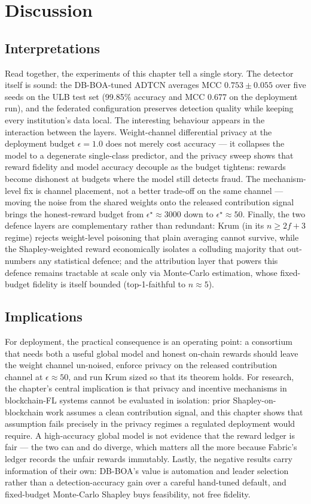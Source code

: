\FloatBarrier

\section{Discussion}
\label{sec:discussion}

\subsection{Interpretations}
Read together, the experiments of this chapter tell a single story. The detector itself is sound: the DB-BOA-tuned ADTCN averages MCC $0.753 \pm 0.055$ over five seeds on the ULB test set (99.85\% accuracy and MCC 0.677 on the deployment run), and the federated configuration preserves detection quality while keeping every institution's data local. The interesting behaviour appears in the interaction between the layers. Weight-channel differential privacy at the deployment budget $\epsilon=1.0$ does not merely cost accuracy --- it collapses the model to a degenerate single-class predictor, and the privacy sweep shows that reward fidelity and model accuracy decouple as the budget tightens: rewards become dishonest at budgets where the model still detects fraud. The mechanism-level fix is channel placement, not a better trade-off on the same channel --- moving the noise from the shared weights onto the released contribution signal brings the honest-reward budget from $\epsilon^{\star}\approx 3000$ down to $\epsilon^{\star}\approx 50$. Finally, the two defence layers are complementary rather than redundant: Krum (in its $n\ge 2f+3$ regime) rejects weight-level poisoning that plain averaging cannot survive, while the Shapley-weighted reward economically isolates a colluding majority that out-numbers any statistical defence; and the attribution layer that powers this defence remains tractable at scale only via Monte-Carlo estimation, whose fixed-budget fidelity is itself bounded (top-1-faithful to $n\approx 5$).

\subsection{Implications}
For deployment, the practical consequence is an operating point: a consortium that needs both a useful global model and honest on-chain rewards should leave the weight channel un-noised, enforce privacy on the released contribution channel at $\epsilon\approx 50$, and run Krum sized so that its theorem holds. For research, the chapter's central implication is that privacy and incentive mechanisms in blockchain-FL systems cannot be evaluated in isolation: prior Shapley-on-blockchain work assumes a clean contribution signal, and this chapter shows that assumption fails precisely in the privacy regimes a regulated deployment would require. A high-accuracy global model is not evidence that the reward ledger is fair --- the two can and do diverge, which matters all the more because Fabric's ledger records the unfair rewards immutably. Lastly, the negative results carry information of their own: DB-BOA's value is automation and leader selection rather than a detection-accuracy gain over a careful hand-tuned default, and fixed-budget Monte-Carlo Shapley buys feasibility, not free fidelity.

